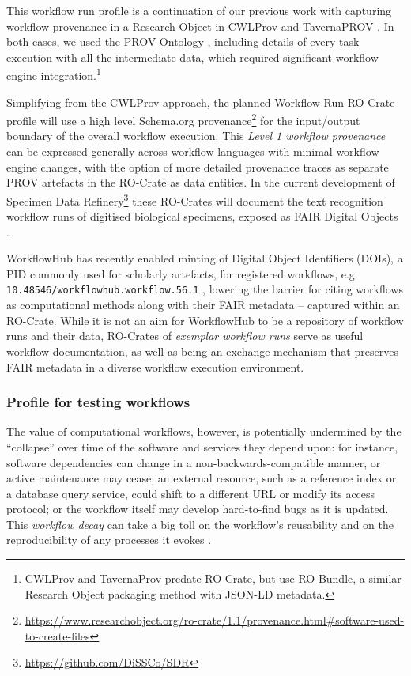 \documentclass[ds,v1.1.2,openaccess]{iosart2x}%
\begin{document}
This workflow run profile is a continuation of our previous work with
capturing workflow provenance in a Research Object in CWLProv
\cite{doi:10.1093/gigascience/giz095} and TavernaPROV
\cite{doi:10.5281/zenodo.51314}. In both cases, we used the PROV Ontology
\cite{CheckMyCrate}, including details of every task execution with all the
intermediate data, which required significant workflow engine
integration.\footnote{CWLProv and TavernaProv predate RO-Crate, but use
RO-Bundle\cite{doi:10.5281/zenodo.12586}, a similar Research Object
packaging method with JSON-LD metadata.}

Simplifying from the CWLProv approach, the planned Workflow Run
RO-Crate profile will use a high level Schema.org
provenance\footnote{\url{https://www.researchobject.org/ro-crate/1.1/provenance.html\#software-used-to-create-files}}
for the input/output boundary of the overall workflow execution. This
\textit{Level 1 workflow provenance} \cite{doi:10.1093/gigascience/giz095} can be
expressed generally across workflow languages with minimal workflow
engine changes, with the option of more detailed provenance traces as
separate PROV artefacts in the RO-Crate as data entities. In the
current development of Specimen Data
Refinery\footnote{\url{https://github.com/DiSSCo/SDR}} \cite{doi:10.3897/rio.6.e57602}
these RO-Crates will document the text recognition workflow runs of
digitised biological specimens, exposed as FAIR Digital Objects
\cite{doi:10.3390/publications8020021}.

WorkflowHub has recently enabled minting of Digital Object Identifiers
(DOIs), a PID commonly used for scholarly artefacts, for registered
workflows, e.g. \texttt{10.48546/workflowhub.workflow.56.1}
\cite{doi:10.48546/workflowhub.workflow.56.1}, lowering the barrier for
citing workflows as computational methods along with their FAIR
metadata -- captured within an RO-Crate. While it is not an aim for
WorkflowHub to be a repository of workflow runs and their data,
RO-Crates of \textit{exemplar workflow runs} serve as useful workflow
documentation, as well as being an exchange mechanism that preserves
FAIR metadata in a diverse workflow execution environment.

\subsubsection{Profile for testing workflows}

The value of computational workflows, however, is potentially
undermined by the ``collapse'' over time of the software and services
they depend upon: for instance, software dependencies can change in a
non-backwards-compatible manner, or active maintenance may cease; an
external resource, such as a reference index or a database query
service, could shift to a different URL or modify its access protocol;
or the workflow itself may develop hard-to-find bugs as it is updated.
This \textit{workflow decay} can take a big toll on the workflow's reusability
and on the reproducibility of any processes it evokes
\cite{doi:10.1109/eScience.2012.6404482}.
\end{document}
